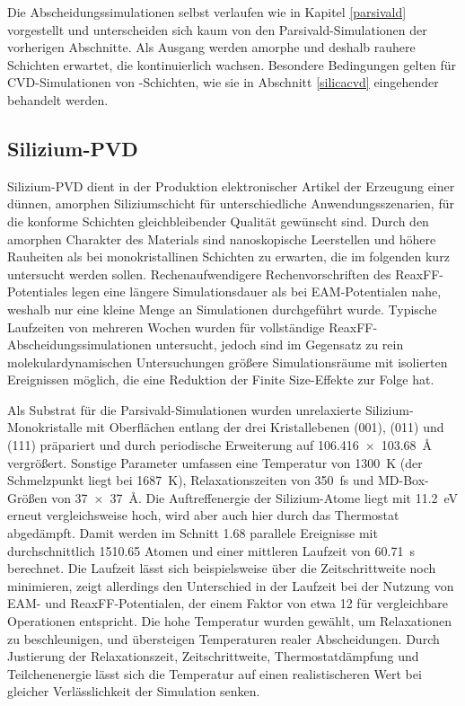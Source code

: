 Die Abscheidungssimulationen selbst verlaufen wie in Kapitel \ref{parsivald} vorgestellt und unterscheiden sich kaum von den Parsivald-Simulationen der vorherigen Abschnitte.
Als Ausgang werden amorphe und deshalb rauhere Schichten erwartet, die kontinuierlich wachsen.
Besondere Bedingungen gelten für CVD-Simulationen von -Schichten, wie sie in Abschnitt \ref{silicacvd} eingehender behandelt werden.

\subsection{Silizium-PVD}

Silizium-PVD dient in der Produktion elektronischer Artikel der Erzeugung einer dünnen, amorphen Siliziumschicht für unterschiedliche Anwendungsszenarien, für die konforme Schichten gleichbleibender Qualität gewünscht sind.
Durch den amorphen Charakter des Materials sind nanoskopische Leerstellen und höhere Rauheiten als bei monokristallinen Schichten zu erwarten, die im folgenden kurz untersucht werden sollen.
Rechenaufwendigere Rechenvorschriften des ReaxFF-Potentiales legen eine längere Simulationsdauer als bei EAM-Potentialen nahe, weshalb nur eine kleine Menge an Simulationen durchgeführt wurde.
Typische Laufzeiten von mehreren Wochen wurden für vollständige ReaxFF-Abscheidungssimulationen untersucht, jedoch sind im Gegensatz zu rein molekulardynamischen Untersuchungen größere Simulationsräume mit isolierten Ereignissen möglich, die eine Reduktion der Finite Size-Effekte zur Folge hat.

Als Substrat für die Parsivald-Simulationen wurden unrelaxierte Silizium-Monokristalle mit Oberflächen entlang der drei Kristallebenen (001), (011) und (111) präpariert und durch periodische Erweiterung auf \SI{106.416x103.68}{\angstrom} vergrößert.
Sonstige Parameter umfassen eine Temperatur von \SI{1300}{\kelvin} (der Schmelzpunkt liegt bei \SI{1687}{\kelvin}), Relaxationszeiten von \SI{350}{\femto\second} und MD-Box-Größen von \SI{37x37}{\angstrom}.
Die Auftreffenergie der Silizium-Atome liegt mit \SI{11.2}{\electronvolt} erneut vergleichsweise hoch, wird aber auch hier durch das Thermostat abgedämpft.
Damit werden im Schnitt \num{1.68} parallele Ereignisse mit durchschnittlich \num{1510.65} Atomen und einer mittleren Laufzeit von \SI{60.71}{\second} berechnet.
Die Laufzeit lässt sich beispielsweise über die Zeitschrittweite noch minimieren, zeigt allerdings den Unterschied in der Laufzeit bei der Nutzung von EAM- und ReaxFF-Potentialen, der einem Faktor von etwa \num{12} für vergleichbare Operationen entspricht.
Die hohe Temperatur wurden gewählt, um Relaxationen zu beschleunigen, und übersteigen Temperaturen realer Abscheidungen.
Durch Justierung der Relaxationszeit, Zeitschrittweite, Thermostatdämpfung und Teilchenenergie lässt sich die Temperatur auf einen realistischeren Wert bei gleicher Verlässlichkeit der Simulation senken.

